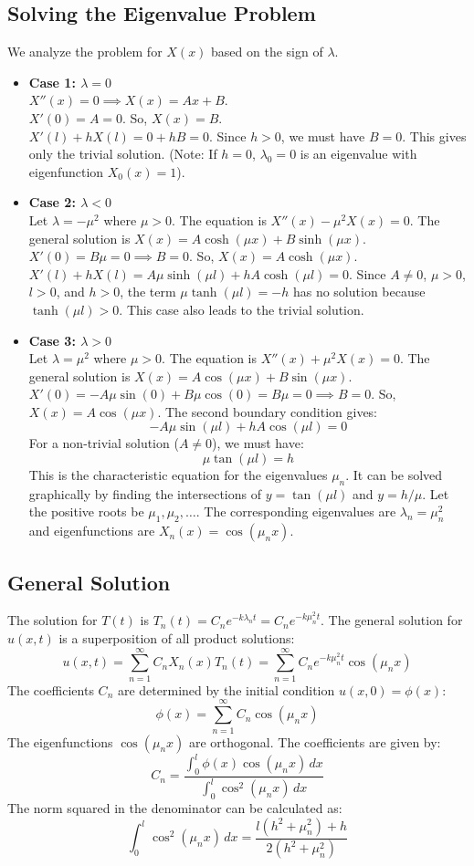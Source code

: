 \documentclass{article}
\begin{document}
	\subsection*{Solving the Eigenvalue Problem}
	We analyze the problem for $X(x)$ based on the sign of $\lambda$.
	\begin{itemize}
		\item \textbf{Case 1: $\lambda = 0$} \\
		$X''(x) = 0 \implies X(x) = Ax + B$. \\
		$X'(0) = A = 0$. So, $X(x) = B$. \\
		$X'(l) + hX(l) = 0 + hB = 0$. Since $h>0$, we must have $B=0$. This gives only the trivial solution.
		(Note: If $h=0$, $\lambda_0=0$ is an eigenvalue with eigenfunction $X_0(x)=1$).
		
		\item \textbf{Case 2: $\lambda < 0$} \\
		Let $\lambda = -\mu^2$ where $\mu > 0$. The equation is $X''(x) - \mu^2 X(x) = 0$.
		The general solution is $X(x) = A \cosh(\mu x) + B \sinh(\mu x)$.
		$X'(0) = B\mu = 0 \implies B=0$. So, $X(x) = A \cosh(\mu x)$.
		$X'(l) + hX(l) = A\mu\sinh(\mu l) + hA\cosh(\mu l) = 0$.
		Since $A \neq 0$, $\mu > 0$, $l > 0$, and $h > 0$, the term $\mu\tanh(\mu l) = -h$ has no solution because $\tanh(\mu l) > 0$. This case also leads to the trivial solution.
		
		\item \textbf{Case 3: $\lambda > 0$} \\
		Let $\lambda = \mu^2$ where $\mu > 0$. The equation is $X''(x) + \mu^2 X(x) = 0$.
		The general solution is $X(x) = A \cos(\mu x) + B \sin(\mu x)$.
		$X'(0) = -A\mu\sin(0) + B\mu\cos(0) = B\mu = 0 \implies B=0$.
		So, $X(x) = A \cos(\mu x)$.
		The second boundary condition gives:
		$$ -A\mu\sin(\mu l) + hA\cos(\mu l) = 0 $$
		For a non-trivial solution ($A \neq 0$), we must have:
		$$ \mu \tan(\mu l) = h $$
		This is the characteristic equation for the eigenvalues $\mu_n$. It can be solved graphically by finding the intersections of $y=\tan(\mu l)$ and $y=h/\mu$. Let the positive roots be $\mu_1, \mu_2, \dots$. The corresponding eigenvalues are $\lambda_n = \mu_n^2$ and eigenfunctions are $X_n(x) = \cos(\mu_n x)$.
	\end{itemize}
	
	\subsection*{General Solution}
	The solution for $T(t)$ is $T_n(t) = C_n e^{-k \lambda_n t} = C_n e^{-k \mu_n^2 t}$.
	The general solution for $u(x,t)$ is a superposition of all product solutions:
	$$ u(x,t) = \sum_{n=1}^{\infty} C_n X_n(x) T_n(t) = \sum_{n=1}^{\infty} C_n e^{-k \mu_n^2 t} \cos(\mu_n x) $$
	The coefficients $C_n$ are determined by the initial condition $u(x,0) = \phi(x)$:
	$$ \phi(x) = \sum_{n=1}^{\infty} C_n \cos(\mu_n x) $$
	The eigenfunctions $\cos(\mu_n x)$ are orthogonal. The coefficients are given by:
	$$ C_n = \frac{\int_0^l \phi(x) \cos(\mu_n x) \,dx}{\int_0^l \cos^2(\mu_n x) \,dx} $$
	The norm squared in the denominator can be calculated as:
	$$ \int_0^l \cos^2(\mu_n x) \,dx = \frac{l(h^2+\mu_n^2)+h}{2(h^2+\mu_n^2)} $$
	
\end{document}
